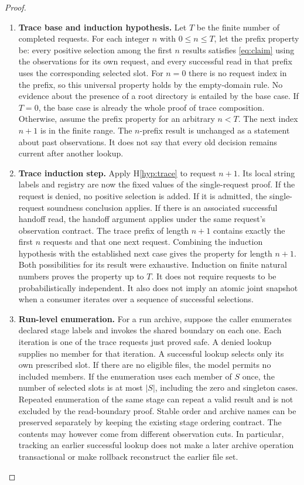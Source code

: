 \documentclass[12pt]{article}
\begin{document}
\begin{proof}
\begin{enumerate}
\item \textbf{Trace base and induction hypothesis.}
Let $T$ be the finite number of completed requests. For each integer
$n$ with $0\le n\le T$, let the prefix property be: every positive
selection among the first $n$ results satisfies \eqref{eq:claim}
using the observations for its own request, and every successful
read in that prefix uses the corresponding selected slot.
For $n=0$ there is no request index in the prefix, so this
universal property holds by the empty-domain rule. No evidence
about the presence of a root directory is entailed by the base case.
If $T=0$, the base case is already the whole proof of trace
composition. Otherwise, assume the prefix property for an arbitrary
$n<T$. The next index $n+1$ is in the finite range.
The $n$-prefix result is unchanged as a statement about past
observations. It does not say that every old decision remains
current after another lookup.

\item \textbf{Trace induction step.}
Apply H\ref{hyp:trace} to request $n+1$. Its local string labels and
registry are now the fixed values of the single-request proof.
If the request is denied, no positive selection is added. If it is
admitted, the single-request soundness conclusion applies.
If there is an associated successful handoff read, the handoff
argument applies under the same request's observation contract.
The trace prefix of length $n+1$ contains exactly the first $n$
requests and that one next request. Combining the induction
hypothesis with the established next case gives the property for
length $n+1$. Both possibilities for its result were exhaustive.
Induction on finite natural numbers proves the property up to
$T$. It does not require requests to be probabilistically
independent. It also does not imply an atomic joint snapshot when
a consumer iterates over a sequence of successful selections.

\item \textbf{Run-level enumeration.}
For a run archive, suppose the caller enumerates declared stage
labels and invokes the shared boundary on each one. Each iteration
is one of the trace requests just proved safe. A denied lookup
supplies no member for that iteration. A successful lookup selects
only its own prescribed slot. If there are no eligible files, the
model permits no included members. If the enumeration uses each
member of $S$ once, the number of selected slots is at most
$|S|$, including the zero and singleton cases. Repeated enumeration of
the same stage can repeat a valid result and is not excluded by the
read-boundary proof. Stable order and archive names can be preserved
separately by keeping the existing stage ordering contract. The
contents may however come from different observation cuts. In
particular, tracking an earlier successful lookup does not make a
later archive operation transactional or make rollback reconstruct
the earlier file set.


\end{enumerate}
\end{proof}
\end{document}
